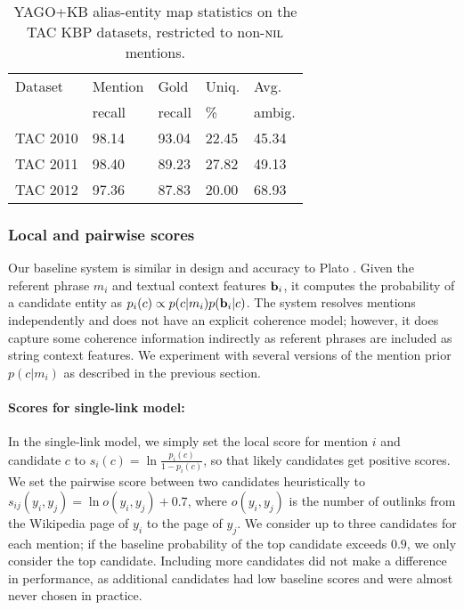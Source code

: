 \begin{table}
  \centering
  \begin{tabular}{l|l|l|l|l}
    Dataset  & Mention &   Gold  & Uniq.  & Avg.  \\
       & recall  & recall  & \%     & ambig. \\
    \hline
    TAC 2010 &  98.14 &  93.04 &  22.45 & 45.34 \\
    \hline
    TAC 2011  & 98.40 & 89.23 & 27.82 & 49.13 \\
    \hline
    TAC 2012  & 97.36 &  87.83 & 20.00  & 68.93
  \end{tabular}
  \caption{YAGO+KB alias-entity map statistics on the TAC KBP datasets, restricted to non-$\mbox{\textsc{nil}}$ mentions.}
  \label{tab:TACAliasTable}
\end{table}


\subsubsection{Local and pairwise scores}
\label{sec:expt:features}

Our baseline system is similar in design and accuracy to Plato \cite{Lazic2015}.
Given the referent phrase $m_i$ and textual context features ${\bf b}_i$, it computes
the probability of a candidate entity as $p_i(c) \propto p(c|m_i)p({\bf b}_i|c)$. 
The system resolves mentions independently and does not have an explicit coherence model;
however, it does capture some coherence information indirectly as referent phrases are
included as string context features. We experiment with several versions of the
mention prior $p(c|m_i)$ as described in the previous section.


\paragraph*{Scores for single-link model:}
In the single-link model, we simply set the local score for
mention $i$ and candidate $c$ to $s_i(c) = \ln \frac{p_i(c )}{1 -
p_i(c)}$, so that likely candidates get positive
scores.  We set the pairwise score between two candidates heuristically to
$s_{ij}(y_i, y_j) = \ln o(y_i, y_j) + 0.7$, where $o(y_i, y_j)$ is the number of
outlinks from the Wikipedia page of $y_i$ to the page of $y_j$.  We
consider up to three candidates for each mention; if the baseline
probability of the top candidate exceeds $0.9$, we only consider the top
candidate. Including more candidates did not make a difference in performance,
as additional candidates had low baseline scores and were almost never chosen
in practice.

